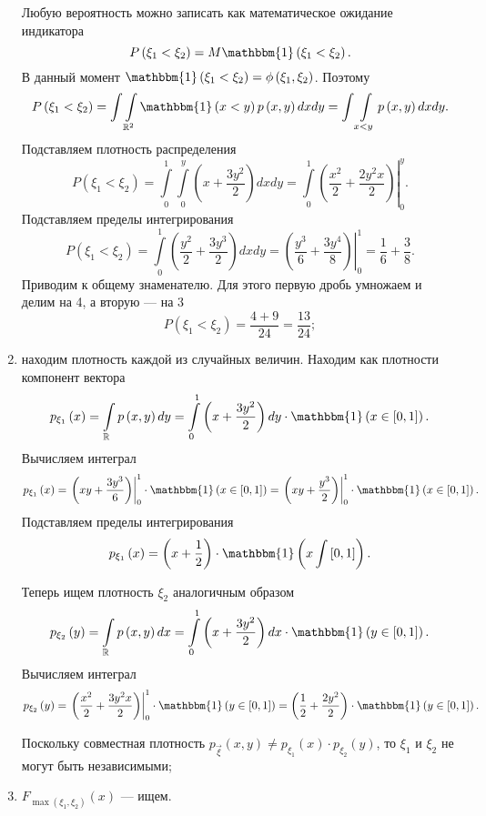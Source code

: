 \begin{enumerate}[label=\alph*)]
Любую вероятность можно записать как математическое ожидание индикатора
$$P \left( \xi_1 < \xi_2 \right) =
M \mathbbm{1} \left( \xi_1 < \xi_2 \right).$$
В данный момент $\mathbbm{1} \left( \xi_1 < \xi_2 \right) = \phi \left( \xi_1, \xi_2 \right) $.
Поэтому
$$P \left( \xi_1 < \xi_2 \right) =
\int \int \limits_{ \mathbb{R}^2} \mathbbm{1} \left( x < y \right) p \left( x, y \right) dxdy =
\int \int \limits_{x < y} p \left( x, y \right) dxdy.$$
Подставляем плотность распределения
$$P \left( \xi_1 < \xi_2 \right) =
\int \limits_0^1 \int \limits_0^y \left( x + \frac{3y^2}{2} \right) dxdy =
\left. \int \limits_0^1 \left( \frac{x^2}{2} + \frac{2y^2 x}{2} \right) \right|_0^y.$$
Подставляем пределы интегрирования
$$P \left( \xi_1 < \xi_2 \right) =
\int \limits_0^1 \left( \frac{y^2}{2} + \frac{3y^3}{2} \right) dxdy =
\left. \left( \frac{y^3}{6} + \frac{3y^4}{8} \right) \right|_0^1 =
\frac{1}{6} + \frac{3}{8}.$$
Приводим к общему знаменателю.
Для этого первую дробь умножаем и делим на 4, а вторую --- на 3
$$P \left( \xi_1 < \xi_2 \right) =
\frac{4+9}{24} =
\frac{13}{24};$$
\item находим плотность каждой из случайных величин.
Находим как плотности компонент вектора
$$p_{ \xi_1} \left( x \right) =
\int \limits_{ \mathbb{R}} p \left( x, y \right) dy =
\int \limits_0^1 \left( x + \frac{3y^2}{2} \right) dy \cdot \mathbbm{1} \left( x \in \left[ 0, 1 \right] \right).$$
Вычисляем интеграл
$$p_{ \xi_1} \left( x \right) =
\left. \left( xy + \frac{3y^3}{6} \right) \right|_0^1 \cdot \mathbbm{1} \left( x \in \left[ 0, 1 \right] \right) =
\left. \left( xy + \frac{y^3}{2} \right) \right|_0^1 \cdot \mathbbm{1} \left( x \in \left[ 0, 1 \right] \right).$$
Подставляем пределы интегрирования
$$p_{ \xi_1} \left( x \right) =
\left( x + \frac{1}{2} \right) \cdot \mathbbm{1} \left( x \int \left[ 0, 1 \right] \right).$$

Теперь ищем плотность $ \xi_2$ аналогичным образом
$$p_{ \xi_2} \left( y \right) =
\int \limits_{ \mathbb{R}} p \left( x, y \right) dx =
\int \limits_0^1 \left( x + \frac{3y^2}{2} \right) dx \cdot \mathbbm{1} \left( y \in \left[ 0, 1 \right] \right).$$
Вычисляем интеграл
$$p_{ \xi_2} \left( y \right) =
\left. \left( \frac{x^2}{2} + \frac{3y^2 x}{2} \right) \right|_0^1 \cdot \mathbbm{1} \left( y \in \left[ 0, 1 \right] \right) =
\left( \frac{1}{2} + \frac{2y^2}{2} \right) \cdot \mathbbm{1} \left( y \in \left[ 0, 1 \right] \right).$$

Поскольку совместная плотность $p_{ \vec{ \xi }} \left( x, y \right) \neq p_{ \xi_1} \left( x \right) \cdot p_{ \xi_2} \left( y \right) $,
то $ \xi_1$ и $ \xi_2$ не могут быть независимыми;
\item $F_{ \max \left( \xi_1, \xi_2 \right) } \left( x \right) $ --- ищем.


\end{enumerate}
